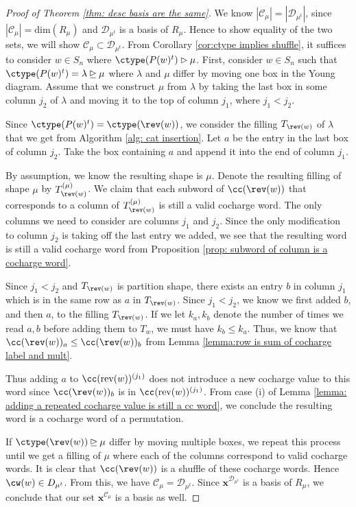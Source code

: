 \begin{proof}[Proof of  Theorem \ref{thm: desc basis are the same}]
We know $|\mathcal{C}_\mu| = |\mathcal{D}_{\mu^t}|$, since $|\mathcal{C}_\mu| = \text{dim}(R_{\mu})$ and $\mathcal{D}_{\mu^t}$ is a basis of $R_{\mu}$.
Hence to show equality of the two sets, we will show $\mathcal{C}_\mu \subset \mathcal{D}_{\mu^t}$.
From Corollary \ref{cor:ctype implies shuffle}, it suffices to consider $w\in S_n$ where $\ctype(P(w)^t) \rhd \mu$.
First, consider $w\in S_n$ such that $\ctype(P(w)^t)  = \lambda\unrhd \mu$ where $\lambda$ and $\mu$ differ by moving one box in the Young diagram. 
Assume that we construct $\mu$ from $\lambda$ by taking the last box in some column $j_2$ of $\lambda$ and moving it to the top of column $j_1$, where $j_1< j_2$. 


Since $\ctype(P(w)^t) = \ctype(\rev(w))$, we consider the filling $T_{\rev(w)}$ of $\lambda$ that we get from Algorithm \ref{alg: cat insertion}.
Let $a$ be the entry in the last box of column $j_2$. 
Take the box containing $a$ and append it into the end of column $j_1$.

By assumption, we know the resulting shape is $\mu$. Denote the resulting filling of shape $\mu$ by $T_{\rev(w)}^{(\mu)}$. 
We claim that each subword of $\cc(\rev(w))$ that corresponds to a column of $T_{\rev(w)}^{(\mu)}$ is still a valid cocharge word.
The only columns we need to consider are columns $j_1$ and $j_2$. Since the only modification to column $j_2$ is taking off the last entry we added, we see that the resulting word is still a valid cocharge word from Proposition \ref{prop: subword of column is a cocharge word}.

Since $j_1< j_2$ and $T_{\rev(w)}$ is partition shape, there exists an entry $b$ in column $j_1$ which is in the same row as $a$ in $T_{\rev(w)}$. Since $j_1<j_2$, we know we first added $b$, and then $a$, to the filling $T_{\rev(w)}$.  If we let $k_a, k_b$ denote the number of times we read $a,b$ before adding them to $T_w$, we must have $k_b \leq  k_a$. Thus, we know that $\cc(\rev(w))_a \leq  \cc(\rev(w))_b$ from Lemma \ref{lemma:row is sum of cocharge label and mult}. 

Thus adding $a$ to $\cc(\text{rev}(w))^{(j_1)}$ does not introduce a new cocharge value to this word since $\cc(\rev(w))_b$ is in $\cc(\text{rev}(w))^{(j_1)}$.
From case (i) of Lemma \ref{lemma: adding a repeated cocharge value is still a cc word}, we conclude the resulting word is a cocharge word of a permutation. 

If $\ctype(\rev(w))\unrhd \mu$ differ by moving multiple boxes, we repeat this process until we get a filling of $\mu$ where each of the columns correspond to valid cocharge words. It is clear that $\cc(\rev(w))$ is a shuffle of these cocharge words.
Hence $\cw(w) \in D_{\mu^t}$.
From this, we have $\mathcal{C}_\mu = \mathcal{D}_{\mu^t}$. Since $\mathbf{x}^{\mathcal{D}_{\mu^t}}$ is a basis of $R_{\mu}$, we conclude that our set  $\mathbf{x}^{\mathcal{C}_\mu}$  is a basis as well.
\end{proof}

